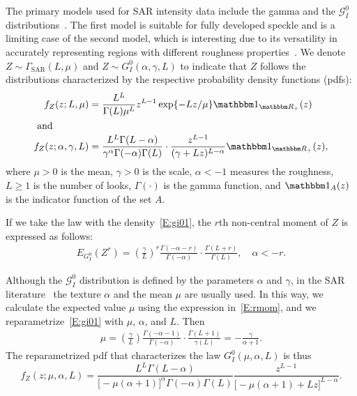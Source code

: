 \documentclass[remotesensing,article,submit,moreauthors,pdftex]{Definitions/mdpi}
\begin{document}
The primary models used for SAR intensity data include the gamma and the
\(\mathcal{G}_I^0\) distributions~\citep{Frery1997}. The first model is suitable for fully developed speckle and is a limiting case of the second model, which is interesting due to its versatility in accurately representing regions with different roughness properties~\citep{Cassetti2022}.
We denote
\(Z \sim \Gamma_{\text{SAR}}(L, \mu)\) and
\(Z \sim G_I^0(\alpha, \gamma, L)\) to indicate that \(Z\) follows the
distributions characterized by the respective probability density
functions (pdfs): 
\begin{align}
    f_Z(z;L, \mu)&=\frac{L^L}{\Gamma(L)\mu^L}z^{L-1}\exp\left\{-Lz/\mu\right\} \mathbbm 1_{\mathbbm R_+}(z)\label{E:gamma1}\\
    \intertext{ and }
    f_Z(z; \alpha, \gamma, L)&=\frac{L^L\Gamma(L-\alpha)}{\gamma^{\alpha}\Gamma(-\alpha)\Gamma(L)}\cdot\frac{z^{L-1}}{(\gamma+Lz)^{L-\alpha}} \mathbbm 1_{\mathbbm R_+}(z),\label{E:gi01}
\end{align} 
where \(\mu > 0\) is the mean, \(\gamma > 0\) is the scale, \(\alpha < -1\) measures
the roughness, \(L \geq 1\) is the number of looks, \(\Gamma(\cdot)\) is
the gamma function, and \(\mathbbm 1_{A}(z)\) is the indicator function
of the set \(A\).

If we take the law with the density~\eqref{E:gi01}, the \(r\)th non-central moment of \(Z\) is expressed as follows:
\begin{align}
    E_{G_I^0}\left(Z^r\right)=\left(\frac{\gamma}{L}\right)^r\frac{\Gamma(-\alpha-r)}{\Gamma(-\alpha)}\cdot\frac{\Gamma(L+r)}{\Gamma(L)}, \quad \alpha <-r. 
    \label{E:rmom}
\end{align}

Although the \(\mathcal{G}_I^0\) distribution is defined by the parameters \(\alpha\) and \(\gamma\), in the SAR literature~\cite{Nascimento2010} the texture \(\alpha\) and the mean \(\mu\) are usually used. In this way, we calculate the expected value \(\mu\) using the expression in~\eqref{E:rmom}, and we reparametrize~\eqref{E:gi01} with \(\mu\),
\(\alpha\), and \(L\).
Then \begin{align*}
    \mu=\left(\frac{\gamma}{L}\right)\frac{\Gamma(-\alpha-1)}{\Gamma(-\alpha)}\cdot\frac{\Gamma(L+1)}{\gamma(L)}=-\frac{\gamma}{\alpha+1}.
\end{align*} 
The reparametrized pdf that characterizes the law \(G_I^0(\mu, \alpha, L)\) is thus
\begin{equation}
        f_Z(z; \mu, \alpha, L)=\frac{L^L\Gamma(L-\alpha)}{\big[-\mu(\alpha+1)\big]^{\alpha}\Gamma(-\alpha)\Gamma(L)} \frac{z^{L-1}}{\big[-\mu(\alpha+1)+Lz\big]^{L-\alpha}}.\label{E:gi02}
\end{equation}
\end{document}
